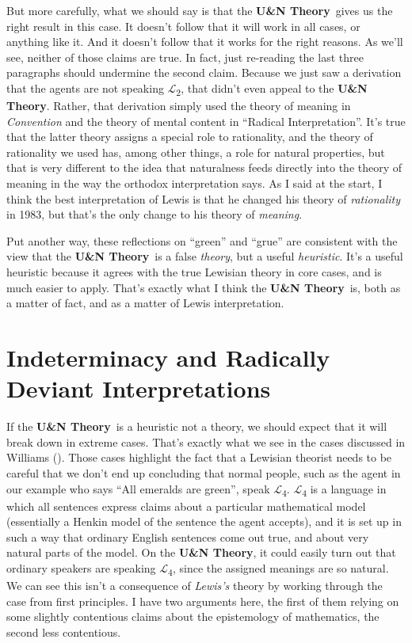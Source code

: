 \documentclass[
  11pt,
  letterpaper,
  DIV=11,
  numbers=noendperiod,
  twoside]{scrartcl}
\begin{document}
But more carefully, what we should say is that the \textbf{U\&N
Theory}~gives us the right result in this case. It doesn't follow that
it will work in all cases, or anything like it. And it doesn't follow
that it works for the right reasons. As we'll see, neither of those
claims are true. In fact, just re-reading the last three paragraphs
should undermine the second claim. Because we just saw a derivation that
the agents are not speaking \(\mathcal{L}\)\textsubscript{2}, that
didn't even appeal to the \textbf{U\&N Theory}. Rather, that derivation
simply used the theory of meaning in \emph{Convention} and the theory of
mental content in ``Radical Interpretation''. It's true that the latter
theory assigns a special role to rationality, and the theory of
rationality we used has, among other things, a role for natural
properties, but that is very different to the idea that naturalness
feeds directly into the theory of meaning in the way the orthodox
interpretation says. As I said at the start, I think the best
interpretation of Lewis is that he changed his theory of
\emph{rationality} in 1983, but that's the only change to his theory of
\emph{meaning}.

Put another way, these reflections on ``green'' and ``grue'' are
consistent with the view that the \textbf{U\&N Theory}~is a false
\emph{theory}, but a useful \emph{heuristic}. It's a useful heuristic
because it agrees with the true Lewisian theory in core cases, and is
much easier to apply. That's exactly what I think the \textbf{U\&N
Theory}~is, both as a matter of fact, and as a matter of Lewis
interpretation.

\section{Indeterminacy and Radically Deviant
Interpretations}\label{indeterminacy-and-radically-deviant-interpretations}

If the \textbf{U\&N Theory}~is a heuristic not a theory, we should
expect that it will break down in extreme cases. That's exactly what we
see in the cases discussed in Williams
(). Those cases highlight the fact that
a Lewisian theorist needs to be careful that we don't end up concluding
that normal people, such as the agent in our example who says ``All
emeralds are green'', speak \(\mathcal{L}\)\textsubscript{4}.
\(\mathcal{L}\)\textsubscript{4} is a language in which all sentences
express claims about a particular mathematical model (essentially a
Henkin model of the sentence the agent accepts), and it is set up in
such a way that ordinary English sentences come out true, and about very
natural parts of the model. On the \textbf{U\&N Theory}, it could easily
turn out that ordinary speakers are speaking
\(\mathcal{L}\)\textsubscript{4}, since the assigned meanings are so
natural. We can see this isn't a consequence of \emph{Lewis's} theory by
working through the case from first principles. I have two arguments
here, the first of them relying on some slightly contentious claims
about the epistemology of mathematics, the second less contentious.
\end{document}
